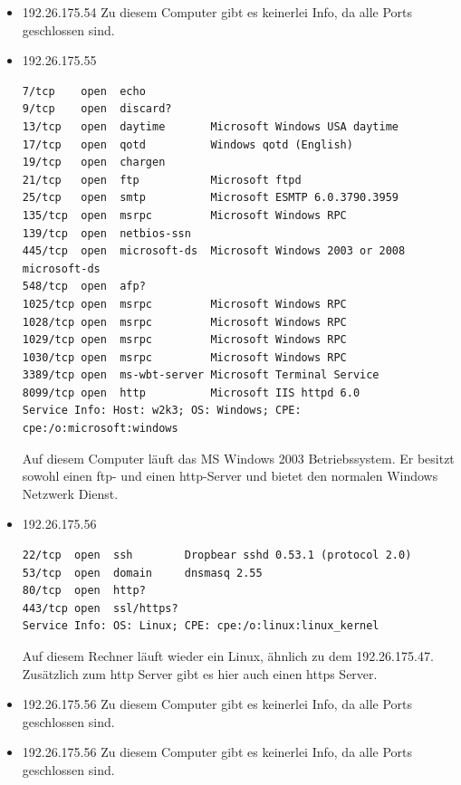 \documentclass[10pt,a4paper]{article}
\begin{document}
\begin{itemize}
\item 192.26.175.54
Zu diesem Computer gibt es keinerlei Info, da alle Ports geschlossen sind.

\item 192.26.175.55
\begin{verbatim}
7/tcp    open  echo
9/tcp    open  discard?
13/tcp   open  daytime       Microsoft Windows USA daytime
17/tcp   open  qotd          Windows qotd (English)
19/tcp   open  chargen
21/tcp   open  ftp           Microsoft ftpd
25/tcp   open  smtp          Microsoft ESMTP 6.0.3790.3959
135/tcp  open  msrpc         Microsoft Windows RPC
139/tcp  open  netbios-ssn
445/tcp  open  microsoft-ds  Microsoft Windows 2003 or 2008 microsoft-ds
548/tcp  open  afp?
1025/tcp open  msrpc         Microsoft Windows RPC
1028/tcp open  msrpc         Microsoft Windows RPC
1029/tcp open  msrpc         Microsoft Windows RPC
1030/tcp open  msrpc         Microsoft Windows RPC
3389/tcp open  ms-wbt-server Microsoft Terminal Service
8099/tcp open  http          Microsoft IIS httpd 6.0
Service Info: Host: w2k3; OS: Windows; CPE: cpe:/o:microsoft:windows
\end{verbatim}
Auf diesem Computer läuft das MS Windows 2003 Betriebssystem. Er besitzt sowohl einen ftp- und einen http-Server und bietet den normalen Windows Netzwerk Dienst.

\item 192.26.175.56
\begin{verbatim}
22/tcp  open  ssh        Dropbear sshd 0.53.1 (protocol 2.0)
53/tcp  open  domain     dnsmasq 2.55
80/tcp  open  http?
443/tcp open  ssl/https?
Service Info: OS: Linux; CPE: cpe:/o:linux:linux_kernel
\end{verbatim}
Auf diesem Rechner läuft wieder ein Linux, ähnlich zu dem 192.26.175.47. Zusätzlich zum http Server gibt es hier auch einen https Server.

\item 192.26.175.56
Zu diesem Computer gibt es keinerlei Info, da alle Ports geschlossen sind.

\item 192.26.175.56
Zu diesem Computer gibt es keinerlei Info, da alle Ports geschlossen sind.

\end{itemize}
\end{document}
